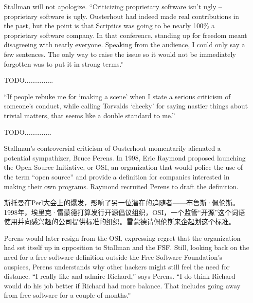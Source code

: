 \ifdefined\eng
Stallman will not apologize.  ``Criticizing proprietary software isn't ugly -- proprietary software is ugly.  Ousterhout had indeed made real contributions in the past, but the point is that Scriptics was going to be nearly 100\% a proprietary software company.  In that conference, standing up for freedom meant disagreeing with nearly everyone. Speaking from the audience, I could only say a few sentences.  The only way to raise the issue so it would not be immediately forgotten was to put it in strong terms.''
\fi

\ifdefined\chs
TODO...............
\fi

\ifdefined\eng
``If people rebuke me for `making a scene' when I state a serious criticism of someone's conduct, while calling Torvalds `cheeky' for saying nastier things about trivial matters, that seems like a double standard to me.''
\fi

\ifdefined\chs
TODO..............
\fi

\ifdefined\eng
Stallman's controversial criticism of Ousterhout momentarily alienated a potential sympathizer, Bruce Perens. In 1998, Eric Raymond proposed launching the Open Source Initiative, or OSI, an organization that would police the use of the term ``open source'' and provide a definition for companies interested in making their own programs. Raymond recruited Perens to draft the definition.
\fi

\ifdefined\chs
斯托曼在Perl大会上的爆发，影响了另一位潜在的追随者——布鲁斯·佩伦斯。1998年，埃里克·雷蒙德打算发行开源倡议组织，OSI，一个监管“开源”这个词语使用并向感兴趣的公司提供标准的组织。雷蒙德请佩伦斯来企起划这个标准。 
\fi

\ifdefined\eng
Perens would later resign from the OSI, expressing regret that the organization had set itself up in opposition to Stallman and the FSF. Still, looking back on the need for a free software definition outside the Free Software Foundation's auspices, Perens understands why other hackers might still feel the need for distance. ``I really like and admire Richard,'' says Perens. ``I do think Richard would do his job better if Richard had more balance. That includes going away from free software for a couple of months.''
\fi

